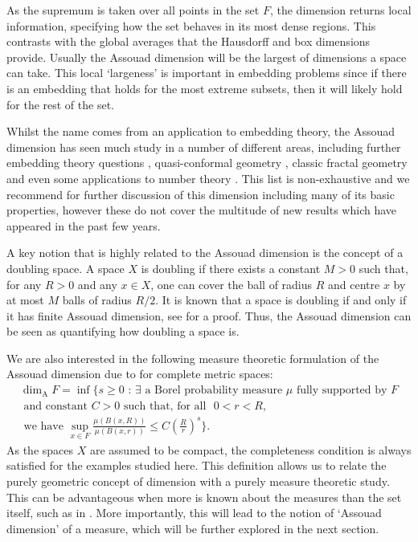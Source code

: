As the supremum is taken over all points in the set $F$, the dimension returns local information, specifying how the set behaves in its most dense regions. This contrasts with the global averages that the Hausdorff and box dimensions provide. Usually the Assouad dimension will be the largest of dimensions a space can take. This local `largeness' is important in embedding problems since if there is an embedding that holds for the most extreme subsets, then it will likely hold for the rest of the set. 

Whilst the name comes from an application to embedding theory, the Assouad dimension has seen much study in a number of different areas, including further embedding theory questions \cite{olson02, olson10, robinson}, quasi-conformal geometry \cite{heinonen, tyson, mackaytyson}, classic fractal geometry \cite{fraser-kaenmaki-proj, fraser-todd, tros, orponen, ldr} and even some applications to number theory \cite{FY, fraser-saito-yu}. This list is non-exhaustive and we recommend \cite{robinson, Fr} for further discussion of this dimension including many of its basic properties, however these do not cover the multitude of new results which have appeared in the past few years. 

A key notion that is highly related to the Assouad dimension is the concept of a doubling space. A space $X$ is doubling if there exists a constant $M > 0$ such that, for any $R > 0$ and any $x \in X$, one can cover the ball of radius $R$ and centre $x$ by at most $M$ balls of radius $R/2$. It is known that a space is doubling if and only if it has finite Assouad dimension, see \cite[Lemma 9.4]{robinson} for a proof. Thus, the Assouad dimension can be seen as quantifying how doubling a space is.

We are also interested in the following measure theoretic formulation of the Assouad dimension due to \cite{luksak, konyagin} for complete metric spaces: 
\begin{align*}
   \dim_{\text{A}} F = \inf \Bigg\{ s \geq 0 \, \,  : \, \exists \text{ a Borel probability measure } \mu \text{ fully supported by }F \\  
   \text{ and constant }C > 0\text{  such that, } \text{for all } \, \, 0< r< R, \\ 
   \text{ we have  }  \sup_{x\in F} \frac{\mu(B(x,R))}{\mu(B(x,r))} \leq C\left(\frac{R}{r}\right)^{s} \Bigg\}. 
\end{align*}
As the spaces $X$ are assumed to be compact, the completeness condition is always satisfied for the examples studied here. This definition allows us to relate the purely geometric concept of dimension with a purely measure theoretic study. This can be advantageous when more is known about the measures than the set itself, such as in \cite{fraser-howroyd1}. More importantly, this will lead to the notion of `Assouad dimension' of a measure, which will be further explored in the next section. 


